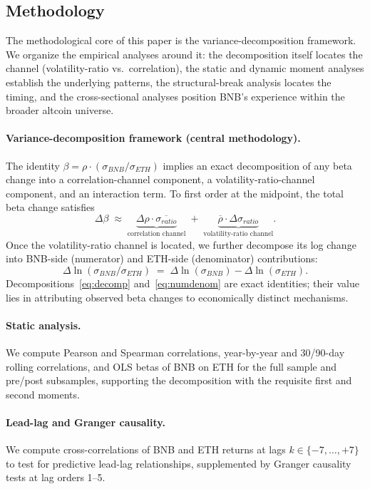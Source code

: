 \documentclass[11pt,a4paper]{article}
\begin{document}
\subsection{Methodology}

The methodological core of this paper is the variance-decomposition framework. We organize the empirical analyses around it: the decomposition itself locates the channel (volatility-ratio vs.\ correlation), the static and dynamic moment analyses establish the underlying patterns, the structural-break analysis locates the timing, and the cross-sectional analyses position BNB's experience within the broader altcoin universe.

\paragraph{Variance-decomposition framework (central methodology).} The identity $\beta = \rho \cdot (\sigma_{BNB}/\sigma_{ETH})$ implies an exact decomposition of any beta change into a correlation-channel component, a volatility-ratio-channel component, and an interaction term. To first order at the midpoint, the total beta change satisfies
\begin{equation}
\Delta\beta \;\approx\; \underbrace{\Delta\rho \cdot \overline{\sigma_{ratio}}}_{\text{correlation channel}} \;+\; \underbrace{\overline{\rho} \cdot \Delta\sigma_{ratio}}_{\text{volatility-ratio channel}}.
\label{eq:decomp}
\end{equation}
Once the volatility-ratio channel is located, we further decompose its log change into BNB-side (numerator) and ETH-side (denominator) contributions:
\begin{equation}
\Delta \ln(\sigma_{BNB}/\sigma_{ETH}) \;=\; \Delta \ln(\sigma_{BNB}) - \Delta \ln(\sigma_{ETH}).
\label{eq:numdenom}
\end{equation}
Decompositions~\eqref{eq:decomp} and~\eqref{eq:numdenom} are exact identities; their value lies in attributing observed beta changes to economically distinct mechanisms.

\paragraph{Static analysis.} We compute Pearson and Spearman correlations, year-by-year and 30/90-day rolling correlations, and OLS betas of BNB on ETH for the full sample and pre/post subsamples, supporting the decomposition with the requisite first and second moments.

\paragraph{Lead-lag and Granger causality.} We compute cross-correlations of BNB and ETH returns at lags $k \in \{-7, \ldots, +7\}$ to test for predictive lead-lag relationships, supplemented by Granger causality tests at lag orders 1--5.
\end{document}
